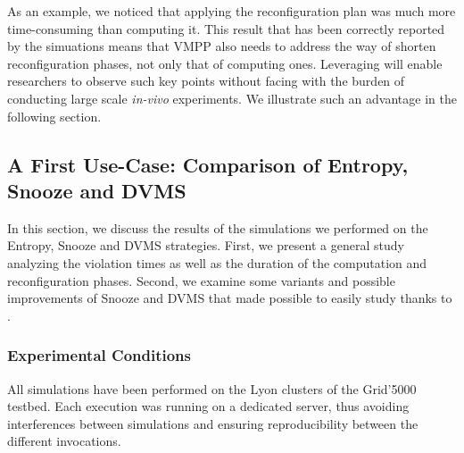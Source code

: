 As an example, we noticed that applying the
reconfiguration plan was much more time-consuming than computing it. This result that has been correctly reported by the simuations means that VMPP also needs
to address the way of shorten reconfiguration phases, not only that of
computing ones.
Leveraging \vmps will enable researchers to observe such key points
without facing with the burden of conducting large scale
\textit{in-vivo} experiments. We illustrate such an advantage in the
following section.

\subsection{A First Use-Case:  Comparison of Entropy, Snooze and DVMS}
\label{subsec:first-usecase}


In this section, we discuss the results of the simulations we
performed on the Entropy, Snooze and DVMS strategies. First, we
present a general study analyzing the violation times as well as the
duration of the computation and reconfiguration phases.
Second, we examine some variants and possible
improvements of Snooze and DVMS that made possible to easily study  thanks to
\vmps.

\subsubsection{Experimental Conditions}
All simulations have been
performed on the Lyon clusters of the Grid'5000 testbed.
Each execution was running on a dedicated server, thus avoiding
interferences between simulations and ensuring reproducibility between
the different invocations.



